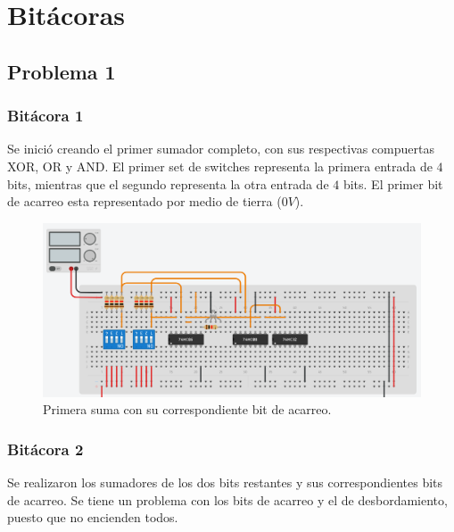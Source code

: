  

\section{Bitácoras}

\subsection{Problema 1}
\subsubsection{Bitácora 1}

Se inició creando el primer sumador completo, con sus respectivas compuertas XOR, OR y AND. El primer set de switches representa la primera entrada de $4$ bits, mientras que el segundo representa la otra entrada de $4$ bits. El primer bit de acarreo esta representado por medio de tierra ($0V$).


\begin{figure}[H]
	\centering
	\includegraphics[scale=0.25]{Images/Parte1SC1.png}
	\caption{Primera suma con su correspondiente bit de acarreo.}
	\label{p1sc1}
\end{figure}

\subsubsection{Bitácora 2}

Se realizaron los sumadores de los dos bits restantes y sus correspondientes bits de acarreo. Se tiene un problema con los bits de acarreo y el de desbordamiento, puesto que no encienden todos.

